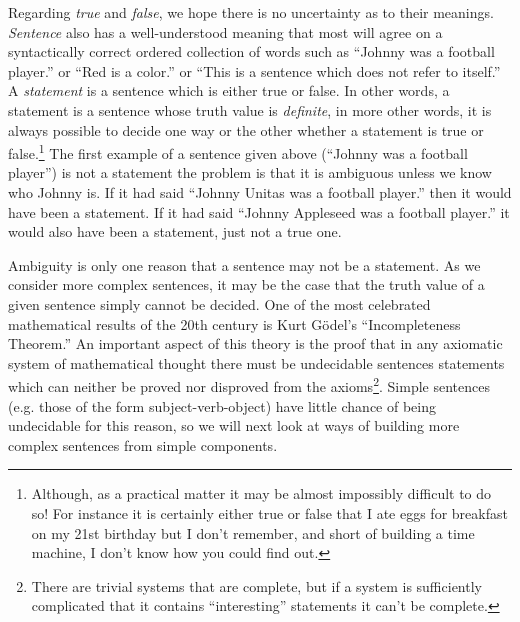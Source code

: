 \documentclass[10pt,]{book}
\theoremstyle{plain}
\theoremstyle{definition}
\theoremstyle{definition}
\numberwithin{equation}{section}
\begin{document}
    Regarding \emph{true} and \emph{false}, we hope there is no uncertainty
    as to their meanings. \emph{Sentence} also has a well-understood
    meaning that most will agree on \textemdash{} a syntactically correct ordered collection
    of words such as ``Johnny was a football player.'' or ``Red is a color.''
    or ``This is a sentence which does not refer to itself.'' A \emph{statement}
    is a sentence which is either true or false.
    In other words, a statement
    is a sentence whose truth value is \emph{definite}, in more other words,
    it is always possible to decide \textemdash{} one way or the other \textemdash{} whether
    a statement is true or false.\footnote{Although, as a practical matter
    it may be almost impossibly difficult to do so!  For instance it is 
    certainly either true or false that I ate eggs for breakfast on my 21st
    birthday \textemdash{} but I don't remember, and short of building a time machine,
    I don't know how you could find out.\label{fn-10}} The first example
    of a sentence given above (``Johnny was a football player'') is not a
    statement \textemdash{} the problem is that it is ambiguous unless we know who
    Johnny is. If it had said ``Johnny Unitas was a football player.'' then
    it would have been a statement. If it had said ``Johnny Appleseed was a
    football player.'' it would also have been a statement, just not a true one.
\par

    Ambiguity is only one reason that a sentence may not be a statement. As
    we consider more complex sentences, it may be the case that the truth
    value of a given sentence simply cannot be decided. One of the most
    celebrated mathematical results of the 20th century is
    Kurt Gödel's
    ``Incompleteness Theorem.''
    An important aspect of this theory is
    the proof that in any axiomatic system of mathematical thought
    there must be undecidable sentences \textemdash{} statements which can neither be proved
    nor disproved from the axioms\footnote{There are trivial systems that 
    are complete, but if a system is sufficiently complicated that it contains 
    ``interesting'' statements it can't be complete.\label{fn-11}}.
    Simple sentences (e.g. those of the form
    subject-verb-object) have little chance of being undecidable for this
    reason, so we will next look at ways of building more complex sentences
    from simple components.
\par
\end{document}
